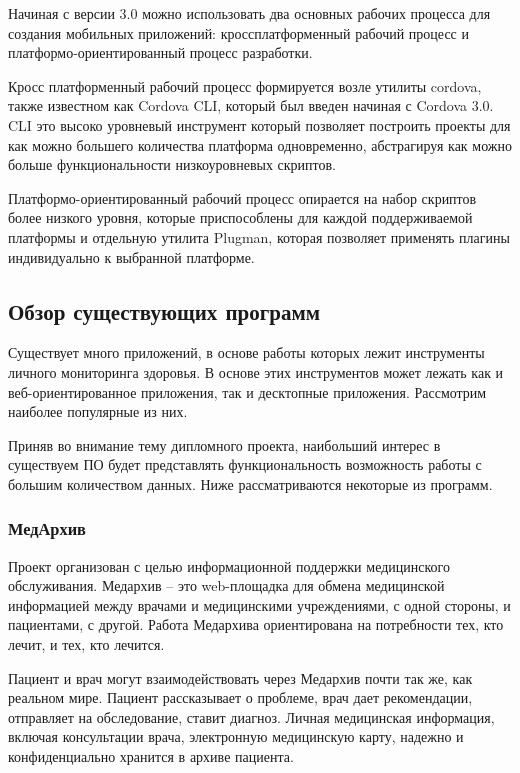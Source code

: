 Начиная с версии 3.0 можно использовать два основных рабочих процесса для создания мобильных приложений: кроссплатформенный рабочий процесс и платформо-ориентированный процесс разработки. 

Кросс платформенный рабочий процесс формируется возле утилиты cordova, также известном как Cordova CLI, который был введен начиная с Cordova 3.0. CLI это высоко уровневый инструмент который позволяет построить проекты для как можно большего количества платформа одновременно, абстрагируя как можно больше функциональности низкоуровневых скриптов. 

Платформо-ориентированный рабочий процесс опирается на набор скриптов более низкого уровня, которые приспособлены для каждой поддерживаемой платформы и отдельную утилита Plugman, которая позволяет применять плагины индивидуально к выбранной платформе.

\subsection{Обзор существующих программ} %
\label{sub:domain:existing_programs}
Существует много приложений, в основе работы которых лежит инструменты личного мониторинга здоровья. В основе этих инструментов может лежать как и веб-ориентированное приложения, так и десктопные приложения. Рассмотрим наиболее популярные из них.

Приняв во внимание тему дипломного проекта, наибольший интерес в существуем ПО будет представлять функциональность возможность работы с большим количеством данных.
Ниже рассматриваются некоторые из программ.

\subsubsection{МедАрхив}

Проект организован с целью информационной поддержки медицинского обслуживания. Медархив -- это web-площадка для обмена медицинской информацией между врачами и медицинскими учреждениями, с одной стороны, и пациентами, с другой. Работа Медархива ориентирована на потребности тех, кто лечит, и тех, кто лечится.

Пациент и врач могут взаимодействовать через Медархив почти так же, как реальном мире. Пациент рассказывает о проблеме, врач дает рекомендации, отправляет на обследование, ставит диагноз. Личная медицинская информация, включая консультации врача, электронную медицинскую карту, надежно и конфиденциально хранится в архиве пациента.


